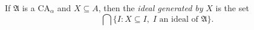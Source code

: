 If $\mathfrak{A}$ is a $\mathrm{CA}_{\alpha}$ and $X \subseteq A$, then the \textit{ideal generated by} $X$ is the set
$$\bigcap \{I : X \subseteq I,\; I \text{ an ideal of } \mathfrak{A}\}.$$
